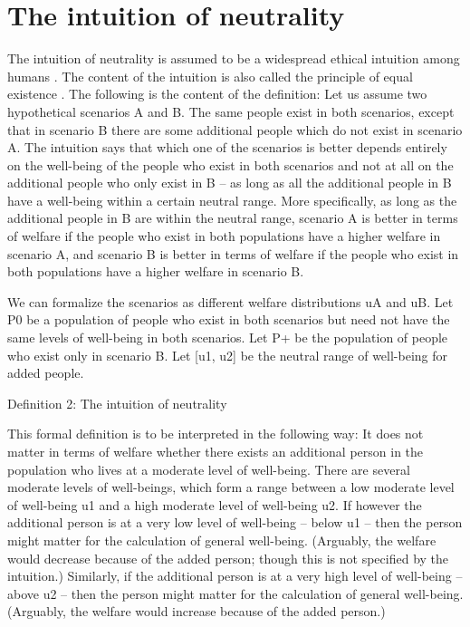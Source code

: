 \section{The intuition of neutrality}

The intuition of neutrality is assumed to be a widespread ethical intuition among humans \cite[p.~176f]{broome_2012}. The content of the intuition is also called the principle of equal existence \cite[p.~146]{broome_2004}. The following is the content of the definition: Let us assume two hypothetical scenarios A and B. The same people exist in both scenarios, except that in scenario B there are some additional people which do not exist in scenario A. The intuition says that which one of the scenarios is better depends entirely on the well-being of the people who exist in both scenarios and not at all on the additional people who only exist in B – as long as all the additional people in B have a well-being within a certain neutral range. More specifically, as long as the additional people in B are within the neutral range, scenario A is better in terms of welfare if the people who exist in both populations have a higher welfare in scenario A, and scenario B is better in terms of welfare if the people who exist in both populations have a higher welfare in scenario B.  

We can formalize the scenarios as different welfare distributions uA and uB. Let P0 be a population of people who exist in both scenarios but need not have the same levels of well-being in both scenarios. Let P+ be the population of people who exist only in scenario B. Let [u1, u2] be the neutral range of well-being for added people.  

Definition 2: The intuition of neutrality 
\begin{comment}
${\exists}$u1, u2: ( ${\forall}$ x ${\in}$ P+ : uB(x) ${\in}$ [u1, u2] ) \ding{213} 

( uB(P0) {\textgreater} uA(P0) \ \ \ding{213} \ \ uB(P0 ${\cup}$ P+) {\textgreater} uA(P0) ) ${\wedge}$  

( uB(P0) {\textless} uA(P0) \ \ \ding{213} \ \ uB(P0 ${\cup}$ P+) {\textless} uA(P0) )  
\end{comment}

This formal definition is to be interpreted in the following way: It does not matter in terms of welfare whether there exists an additional person in the population who lives at a moderate level of well-being. There are several moderate levels of well-beings, which form a range between a low moderate level of well-being u1 and a high moderate level of well-being u2. If however the additional person is at a very low level of well-being – below u1 – then the person might matter for the calculation of general well-being. (Arguably, the welfare would decrease because of the added person; though this is not specified by the intuition.) Similarly, if the additional person is at a very high level of well-being – above u2 – then the person might matter for the calculation of general well-being. (Arguably, the welfare would increase because of the added person.) 

